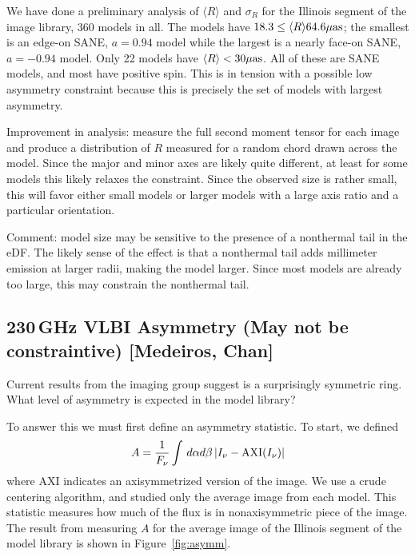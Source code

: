\documentclass[twocolumn,tighten,dvipsnames,linenumbers]{aastex63}
\begin{document}
We have done a preliminary analysis of $\langle R \rangle$ and $\sigma_R$ for the Illinois segment of the image library, 360 models in all.  The models have  $18.3 \le \langle R \rangle 64.6 \mathrm{\mu as}$; the smallest is an edge-on SANE, $a = 0.94$ model while the largest is a nearly face-on SANE, $a = -0.94$ model.  Only 22 models have $\langle R \rangle < 30\mathrm{\mu as}$.  All of these are SANE models, and most have positive spin.  This is in tension with a possible low  asymmetry constraint because this is precisely the set of models with largest asymmetry.

Improvement in analysis: measure the full second moment tensor for each image and produce a distribution of $R$ measured for a random chord drawn across the model.  Since the major and minor axes are likely quite different, at least for some models \citep{2019ApJ...871...30I} this likely relaxes the constraint.  Since the observed size is rather small, this will favor either small models or larger models with a large axis ratio and a particular orientation.

Comment: model size may be sensitive to the presence of a nonthermal tail in the eDF.  The likely sense of the effect is that a nonthermal tail adds millimeter emission at larger radii, making the model larger.  Since most models are already too large, this may constrain the nonthermal tail.

\subsection{230\,GHz VLBI Asymmetry (May not be constraintive)
  [Medeiros, Chan]}
\label{sec:230asym}

Current results from the imaging group suggest \sgra is a surprisingly symmetric ring.   What level of asymmetry is expected in the model library?

To answer this we must first define an asymmetry statistic.  To start, we defined
\begin{equation}
  A = \frac{1}{F_\nu} \int \, d\alpha d\beta \, | I_\nu - {\rm AXI}(I_\nu) |
\end{equation}
where AXI indicates an axisymmetrized version of the image.  We use a crude centering algorithm, and studied only the average image from each model.  This statistic measures how much of the flux is in nonaxisymmetric piece of the image.   The result from measuring $A$ for the average image of the Illinois segment of the \sgra model library is shown in Figure~\ref{fig:asymm}.
\end{document}

